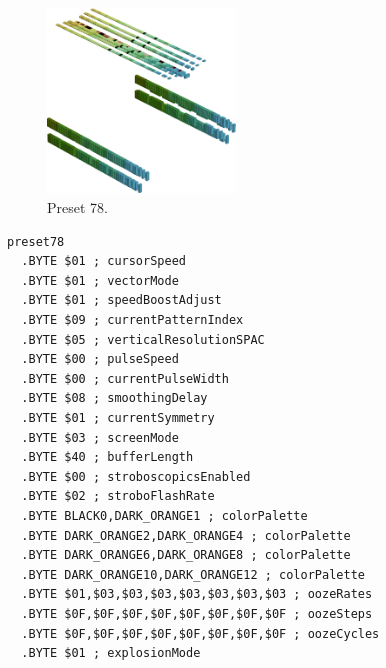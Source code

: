 \clearpage
\begin{minipage}[b]{0.48\linewidth}
\begin{figure}[H]                                                          
  \centering                                                             
  \begin{adjustbox}{width=5cm,center}                                   
  \includegraphics[width=5cm]{src/colorspace_presets/preset78-45.png}%
  \end{adjustbox}                                                        
\caption*{Preset 78.}                                           
\end{figure}                                                               
\end{minipage}
\hspace{0.1cm}
\begin{minipage}[b]{0.48\linewidth}                            
\begin{lstlisting}[basicstyle=\ttfamily\tiny]
preset78
  .BYTE $01 ; cursorSpeed
  .BYTE $01 ; vectorMode
  .BYTE $01 ; speedBoostAdjust
  .BYTE $09 ; currentPatternIndex
  .BYTE $05 ; verticalResolutionSPAC
  .BYTE $00 ; pulseSpeed
  .BYTE $00 ; currentPulseWidth
  .BYTE $08 ; smoothingDelay
  .BYTE $01 ; currentSymmetry
  .BYTE $03 ; screenMode
  .BYTE $40 ; bufferLength
  .BYTE $00 ; stroboscopicsEnabled
  .BYTE $02 ; stroboFlashRate
  .BYTE BLACK0,DARK_ORANGE1 ; colorPalette
  .BYTE DARK_ORANGE2,DARK_ORANGE4 ; colorPalette
  .BYTE DARK_ORANGE6,DARK_ORANGE8 ; colorPalette
  .BYTE DARK_ORANGE10,DARK_ORANGE12 ; colorPalette
  .BYTE $01,$03,$03,$03,$03,$03,$03,$03 ; oozeRates
  .BYTE $0F,$0F,$0F,$0F,$0F,$0F,$0F,$0F ; oozeSteps
  .BYTE $0F,$0F,$0F,$0F,$0F,$0F,$0F,$0F ; oozeCycles
  .BYTE $01 ; explosionMode
\end{lstlisting}
\end{minipage}

\vspace*{0.3cm}

